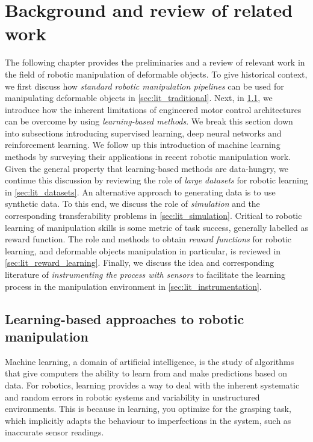 \documentclass[\home/main.tex]{subfiles}
\begin{document}
\chapter{Background and review of related work} \label{ch:lit}

The following chapter provides the preliminaries and a review of relevant work in the field of robotic manipulation of deformable objects. To give historical context, we first discuss how \emph{standard robotic manipulation pipelines} can be used for manipulating deformable objects in \cref{sec:lit_traditional}. Next, in \cref{sec:lit_learning}, we introduce how the inherent limitations of engineered motor control architectures can be overcome by using \emph{learning-based methods}. We break this section down into subsections introducing supervised learning, deep neural networks and reinforcement learning. We follow up this introduction of machine learning methods by surveying their applications in recent robotic manipulation work. Given the general property that learning-based methods are data-hungry, we continue this discussion by reviewing the role of \emph{large datasets} for robotic learning in \cref{sec:lit_datasets}. An alternative approach to generating data is to use synthetic data. To this end, we discuss the role of \emph{simulation} and the corresponding transferability problems in \cref{sec:lit_simulation}. Critical to robotic learning of manipulation skills is some metric of task success, generally labelled as reward function. The role and methods to obtain \emph{reward functions} for robotic learning, and deformable objects manipulation in particular, is reviewed in \cref{sec:lit_reward_learning}. Finally, we discuss the idea and corresponding literature of \emph{instrumenting the process with sensors} to facilitate the learning process in the manipulation environment in \cref{sec:lit_instrumentation}.



\section{Learning-based approaches to robotic manipulation} \label{sec:lit_learning}

Machine learning, a domain of artificial intelligence, is the study of algorithms that give computers the ability to learn from and make predictions based on data. For robotics, learning provides a way to deal with the inherent systematic and random errors in robotic systems and variability in unstructured environments. This is because in learning, you optimize for the grasping task, which implicitly adapts the behaviour to imperfections in the system, such as inaccurate sensor readings.
\end{document}
